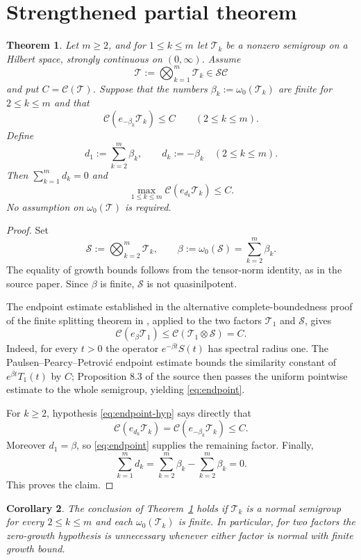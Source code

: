 \documentclass[11pt]{article}
\newtheorem{theorem}{Theorem}
\newtheorem{corollary}[theorem]{Corollary}
\newcommand{\Csim}{\mathcal C}
\newcommand{\SC}{\mathcal{SC}}
\newcommand{\T}{\mathcal T}
\newcommand{\Sg}{\mathcal S}
\begin{document}
\section{Strengthened partial theorem}

\begin{theorem}\label{thm:main}
Let $m\geq2$, and for $1\leq k\leq m$ let $\T_k$ be a nonzero semigroup on a
Hilbert space, strongly continuous on $(0,\infty)$.  Assume
\[
  \T:=\bigotimes_{k=1}^m\T_k\in\SC
\]
and put $C=\Csim(\T)$.  Suppose that the numbers
$\beta_k:=\omega_0(\T_k)$ are finite for $2\leq k\leq m$ and that
\begin{equation}\label{eq:endpoint-hyp}
  \Csim(e_{-\beta_k}\T_k)\leq C
  \qquad(2\leq k\leq m).
\end{equation}
Define
\[
 d_1:=\sum_{k=2}^m\beta_k,
 \qquad d_k:=-\beta_k\quad(2\leq k\leq m).
\]
Then $\sum_{k=1}^m d_k=0$ and
\[
  \max_{1\leq k\leq m}\Csim(e_{d_k}\T_k)\leq C.
\]
No assumption on $\omega_0(\T)$ is required.
\end{theorem}

\begin{proof}
Set
\[
  \Sg:=\bigotimes_{k=2}^m\T_k,
  \qquad \beta:=\omega_0(\Sg)=\sum_{k=2}^m\beta_k.
\]
The equality of growth bounds follows from the tensor-norm identity, as in
the source paper.  Since $\beta$ is finite, $\Sg$ is not quasinilpotent.

The endpoint estimate established in the alternative complete-boundedness
proof of the finite splitting theorem in \cite[Sec.~8]{OMT}, applied to the
two factors $\T_1$ and $\Sg$, gives
\begin{equation}\label{eq:endpoint}
  \Csim(e_{\beta}\T_1)
  \leq \Csim(\T_1\otimes\Sg)=C.
\end{equation}
Indeed, for every $t>0$ the operator
$e^{-\beta t}S(t)$ has spectral radius one.  The
Paulsen--Pearcy--Petrovi\'c endpoint estimate bounds the similarity constant
of $e^{\beta t}T_1(t)$ by $C$; Proposition 8.3 of the source then passes the
uniform pointwise estimate to the whole semigroup, yielding
\eqref{eq:endpoint}.

For $k\geq2$, hypothesis \eqref{eq:endpoint-hyp} says directly that
\[
  \Csim(e_{d_k}\T_k)=\Csim(e_{-\beta_k}\T_k)\leq C.
\]
Moreover $d_1=\beta$, so \eqref{eq:endpoint} supplies the remaining factor.
Finally,
\[
  \sum_{k=1}^m d_k
  =\sum_{k=2}^m\beta_k-\sum_{k=2}^m\beta_k=0.
\]
This proves the claim.
\end{proof}

\begin{corollary}\label{cor:normal}
The conclusion of Theorem~\ref{thm:main} holds if $\T_k$ is a normal
semigroup for every $2\leq k\leq m$ and each $\omega_0(\T_k)$ is finite.
In particular, for two factors the zero-growth hypothesis is unnecessary
whenever either factor is normal with finite growth bound.
\end{corollary}
\end{document}
